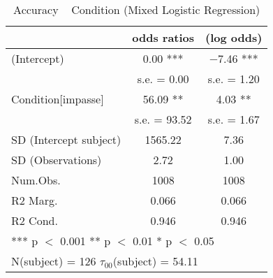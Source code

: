 \begin{table}
\caption{Accuracy ~ Condition (Mixed Logistic Regression)}
\centering
\begin{tabular}[t]{lcc}
\toprule
  & odds ratios & (log odds)\\
\midrule
(Intercept) & \num{0.00} *** & \num{-7.46} ***\\
 & s.e. = \num{0.00} & s.e. = \num{1.20}\\
Condition[impasse] & \num{56.09} ** & \num{4.03} **\\
 & s.e. = \num{93.52} & s.e. = \num{1.67}\\
SD (Intercept subject) & \num{1565.22} & \num{7.36}\\
SD (Observations) & \num{2.72} & \num{1.00}\\
\midrule
Num.Obs. & \num{1008} & \num{1008}\\
R2 Marg. & \num{0.066} & \num{0.066}\\
R2 Cond. & \num{0.946} & \num{0.946}\\
\bottomrule
\multicolumn{3}{l}{\rule{0pt}{1em}***  p $<$ 0.001  ** p $<$ 0.01  * p $<$ 0.05}\\
\multicolumn{3}{l}{\rule{0pt}{1em}N(subject) = 126 $\tau_{00}$(subject) = 54.11}\\
\end{tabular}
\label{tab_SGC3A_GLMER_accuracy_lab}
\end{table}